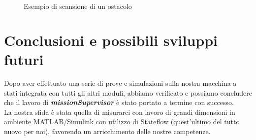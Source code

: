 \documentclass{article}
\begin{document}
            
            \begin{figure} [ht]
                \caption{Esempio di scansione di un ostacolo}
                \label{fig:ostacoli}
            \end{figure}
        
    \section{Conclusioni e possibili sviluppi futuri}
        Dopo aver effettuato una serie di prove e simulazioni sulla nostra macchina a stati integrata con tutti gli altri moduli, abbiamo 
        verificato e possiamo concludere che il lavoro di \textbf{\textit{missionSupervisor}} è stato portato a termine con successo. \\
        La nostra sfida è stata quella di misurarci con 
        lavoro di grandi dimensioni in ambiente MATLAB/Simulink con utilizzo di Stateflow (quest'ultimo del tutto nuovo per noi), favorendo un arricchimento delle nostre 
        competenze.\\
        
\end{document}
